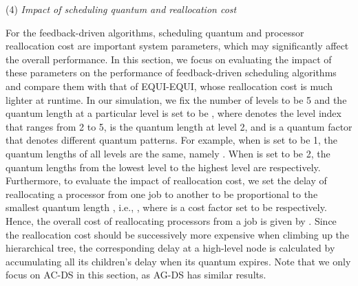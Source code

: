 \documentclass[10pt, a4paper]{article}
\begin{document}
\indent(4) \emph{Impact of scheduling quantum and reallocation cost}

For the feedback-driven algorithms, scheduling quantum and processor reallocation cost are
important system parameters, which may significantly affect the overall performance. In this
section, we focus on evaluating the impact of these parameters on the performance of
feedback-driven scheduling algorithms and compare them with that of EQUI-EQUI, whose reallocation
cost is much lighter at runtime. In our simulation, we fix the number of levels to be 5 and the
quantum length at a particular level is set to be , where  denotes
the level index that ranges from 2 to 5,  is the quantum length at level 2, and  is a
quantum factor that denotes different quantum patterns. For example, when  is set to be 1, the
quantum lengths of all levels are the same, namely . When  is set to be 2, the quantum
lengths from the lowest level to the highest level are  respectively.
Furthermore, to evaluate the impact of reallocation cost, we set the delay of reallocating a
processor from one job to another to be proportional to the smallest quantum length , i.e.,
, where  is a cost factor set to be  respectively. Hence, the
overall cost of reallocating  processors from a job is given by .  Since the
reallocation cost should be successively more expensive when climbing up the hierarchical tree, the
corresponding delay at a high-level node is calculated by accumulating all its children's delay
when its quantum expires. Note that we only focus on AC-DS in this section, as AG-DS has similar
results.
\end{document}
